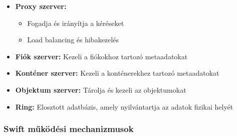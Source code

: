 \documentclass[a4paper,12pt]{article}
\begin{document}
    \begin{itemize}
        \item \textbf{Proxy szerver:}
        \begin{itemize}
            \item Fogadja és irányítja a kéréseket
            \item Load balancing és hibakezelés
        \end{itemize}

        \item \textbf{Fiók szerver:} Kezeli a fiókokhoz tartozó metaadatokat
        \item \textbf{Konténer szerver:} Kezeli a konténerekhez tartozó metaadatokat
        \item \textbf{Objektum szerver:} Tárolja és kezeli az objektumokat
        \item \textbf{Ring:} Elosztott adatbázis, amely nyilvántartja az adatok fizikai helyét
    \end{itemize}

    \subsubsection{Swift működési mechanizmusok}
\end{document}
